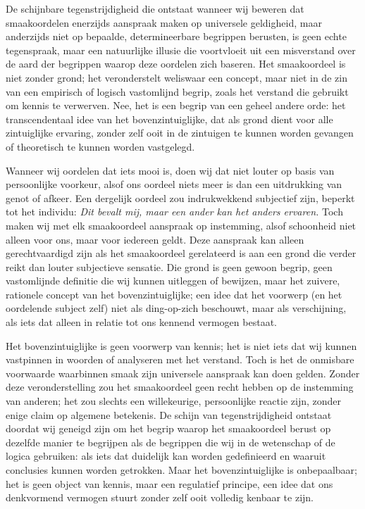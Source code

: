 \begin{mdframed}[leftmargin=0pt,rightmargin=0pt,backgroundcolor=blue!6,linecolor=white,innertopmargin=6pt,innerbottommargin=6pt]

De schijnbare tegenstrijdigheid die ontstaat wanneer wij beweren dat smaakoordelen enerzijds aanspraak maken op universele geldigheid, maar anderzijds niet op bepaalde, determineerbare begrippen berusten, is geen echte tegenspraak, maar een natuurlijke illusie die voortvloeit uit een misverstand over de aard der begrippen waarop deze oordelen zich baseren. Het smaakoordeel is niet zonder grond; het veronderstelt weliswaar een concept, maar niet in de zin van een empirisch of logisch vastomlijnd begrip, zoals het verstand die gebruikt om kennis te verwerven. Nee, het is een begrip van een geheel andere orde: het transcendentaal idee van het bovenzintuiglijke, dat als grond dient voor alle zintuiglijke ervaring, zonder zelf ooit in de zintuigen te kunnen worden gevangen of theoretisch te kunnen worden vastgelegd.

Wanneer wij oordelen dat iets mooi is, doen wij dat niet louter op basis van persoonlijke voorkeur, alsof ons oordeel niets meer is dan een uitdrukking van genot of afkeer. Een dergelijk oordeel zou indrukwekkend subjectief zijn, beperkt tot het individu: \textit{Dit bevalt mij, maar een ander kan het anders ervaren.} Toch maken wij met elk smaakoordeel aanspraak op instemming, alsof schoonheid niet alleen voor ons, maar voor iedereen geldt. Deze aanspraak kan alleen gerechtvaardigd zijn als het smaakoordeel gerelateerd is aan een grond die verder reikt dan louter subjectieve sensatie. Die grond is geen gewoon begrip, geen vastomlijnde definitie die wij kunnen uitleggen of bewijzen, maar het zuivere, rationele concept van het bovenzintuiglijke; een idee dat het voorwerp (en het oordelende subject zelf) niet als ding-op-zich beschouwt, maar als verschijning, als iets dat alleen in relatie tot ons kennend vermogen bestaat.

Het bovenzintuiglijke is geen voorwerp van kennis; het is niet iets dat wij kunnen vastpinnen in woorden of analyseren met het verstand. Toch is het de onmisbare voorwaarde waarbinnen smaak zijn universele aanspraak kan doen gelden. Zonder deze veronderstelling zou het smaakoordeel geen recht hebben op de instemming van anderen; het zou slechts een willekeurige, persoonlijke reactie zijn, zonder enige claim op algemene betekenis. De schijn van tegenstrijdigheid ontstaat doordat wij geneigd zijn om het begrip waarop het smaakoordeel berust op dezelfde manier te begrijpen als de begrippen die wij in de wetenschap of de logica gebruiken: als iets dat duidelijk kan worden gedefinieerd en waaruit conclusies kunnen worden getrokken. Maar het bovenzintuiglijke is onbepaalbaar; het is geen object van kennis, maar een regulatief principe, een idee dat ons denkvormend vermogen stuurt zonder zelf ooit volledig kenbaar te zijn.


\end{mdframed}

